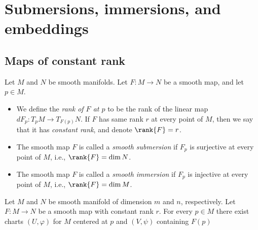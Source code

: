 
\chapter{Submersions, immersions, and embeddings}

\section{Maps of constant rank}

\begin{definition}
    Let $M$ and $N$ be smooth manifolds. Let $F : M \to N$ be a smooth map, and let $p \in M$.
    \begin{itemize}
        \item We define the \emph{rank of $F$ at $p$} to be the rank of the linear map $dF_p : T_pM \to T_{F(p)}N$. If $F$ has same rank $r$ at every point of $M$, then we say that it has \emph{constant rank}, and denote $\rank{F} = r$.
        \item The smooth map $F$ is called a \emph{smooth submersion} if $F_p$ is surjective at every point of $M$, i.e., $\rank{F} = \dim{N}$.
        \item The smooth map $F$ is called a \emph{smooth immersion} if $F_p$ is injective at every point of $M$, i.e., $\rank{F} = \dim{M}$.
    \end{itemize}
\end{definition}

\begin{theorem}
    Let $M$ and $N$ be smooth manifold of dimension $m$ and $n$, respectively. Let $F : M \to N$ be a smooth map with constant rank $r$. For every $p \in M$ there exist charts $(U, \varphi)$ for $M$ centered at $p$ and $(V, \psi)$ containing $F(p)$ 
\end{theorem}





